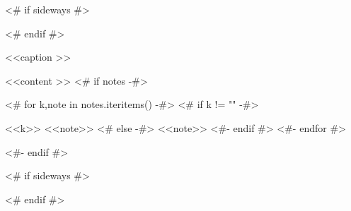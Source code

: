 \begin{<< env  >>}
  \centering
  <# if sideways #>
  \begin{adjustbox}{angle=90}
  <# endif #>
  \begin{threeparttable}
    \caption{<<caption >>}
    <<content >>
    <# if notes -#>
    \begin{tablenotes}
      <# for k,note in notes.iteritems() -#>
      <# if k != "" -#>
      \item [<<k>>] <<note>>
      <# else -#>
      <<note>>
      <#- endif #>
      <#- endfor #>
    \end{tablenotes}
    <#- endif #>
  \end{threeparttable}
  <# if sideways #>
  \end{adjustbox}
  <# endif #>
  \label{tab:<< id >>}
\end{<< env  >>}
